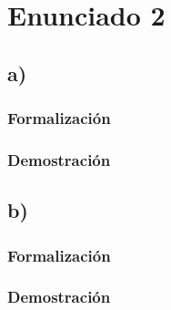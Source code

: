 \documentclass[letterpaper,10pt]{article}
\begin{document}
\section{Enunciado 2}

\subsection{a)}

\subsubsection{Formalizaci\'on}

\subsubsection{Demostraci\'on}

\subsection{b)}

\subsubsection{Formalizaci\'on}

\subsubsection{Demostraci\'on}
\end{document}
